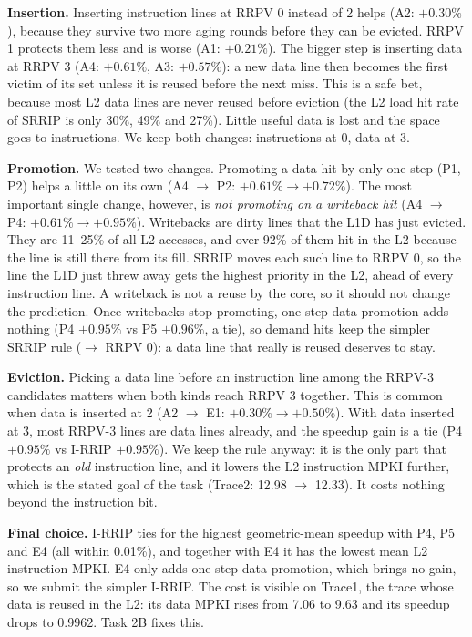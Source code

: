 \textbf{Insertion.} Inserting instruction lines at RRPV 0 instead of 2 helps (A2: $+0.30\%$), because they survive
two more aging rounds before they can be evicted. RRPV 1 protects them less and is worse (A1: $+0.21\%$). The bigger
step is inserting data at RRPV 3 (A4: $+0.61\%$, A3: $+0.57\%$): a new data line then becomes the first victim of its
set unless it is reused before the next miss. This is a safe bet, because most L2 data lines are never reused
before eviction (the L2 load hit rate of SRRIP is only 30\%, 49\% and 27\%). Little useful data is lost and
the space goes to instructions. We keep both changes: instructions at 0, data at 3.

\textbf{Promotion.} We tested two changes. Promoting a data hit by only one step (P1, P2) helps a little on its own
(A4 $\to$ P2: $+0.61\% \to +0.72\%$). The most important single change, however, is \emph{not promoting on a
writeback hit} (A4 $\to$ P4: $+0.61\% \to +0.95\%$). Writebacks are dirty lines that the L1D has just evicted. They
are 11--25\% of all L2 accesses, and over 92\% of them hit in the L2 because the line is still there from its fill.
SRRIP moves each such line to RRPV 0, so the line the L1D just threw away gets the highest priority in the L2, ahead
of every instruction line. A writeback is not a reuse by the core, so it should not change the prediction.
Once writebacks stop promoting, one-step data promotion adds nothing (P4 $+0.95\%$ vs P5 $+0.96\%$, a tie), so
demand hits keep the simpler SRRIP rule ($\to$ RRPV 0): a data line that really is reused deserves to stay.

\textbf{Eviction.} Picking a data line before an instruction line among the RRPV-3 candidates matters when both kinds
reach RRPV 3 together. This is common when data is inserted at 2 (A2 $\to$ E1: $+0.30\% \to +0.50\%$). With data
inserted at 3, most RRPV-3 lines are data lines already, and the speedup gain is a tie (P4 $+0.95\%$ vs I-RRIP
$+0.95\%$). We keep the rule anyway: it is the only part that protects an \emph{old} instruction line, and it
lowers the L2 instruction MPKI further, which is the stated goal of the task (Trace2: 12.98 $\to$ 12.33). It costs
nothing beyond the instruction bit.

\textbf{Final choice.} I-RRIP ties for the highest geometric-mean speedup with P4, P5 and E4 (all within 0.01\%), and
together with E4 it has the lowest mean L2 instruction MPKI. E4 only adds one-step data promotion, which brings no
gain, so we submit the simpler I-RRIP. The cost is visible on Trace1, the trace whose data is reused in the L2:
its data MPKI rises from 7.06 to 9.63 and its speedup drops to 0.9962. Task 2B fixes this.

